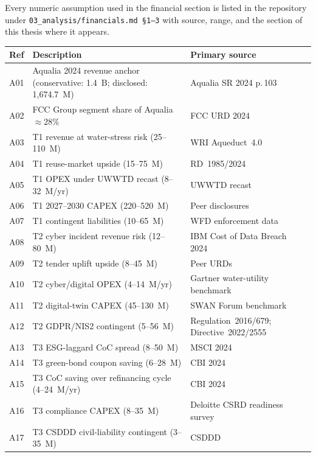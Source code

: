 \documentclass[11pt, a4paper, twoside, openright]{scrreprt}
\newcommand{\euro}{\texteuro}
\begin{document}
Every numeric assumption used in the financial section is listed in the repository under \texttt{03\_analysis/financials.md~\S 1--3} with source, range, and the section of this thesis where it appears.

\begin{center}
\small
\begin{longtable}{@{}lp{9.5cm}p{3cm}@{}}
\toprule
\textbf{Ref} & \textbf{Description} & \textbf{Primary source} \\
\midrule
\endhead
A01 & Aqualia 2024 revenue anchor (conservative: \euro{}1.4~B; disclosed: \euro{}1{,}674.7~M) & Aqualia SR 2024 p.\,103~\cite{aqualiaSR2024} \\
A02 & FCC Group segment share of Aqualia $\approx 28\%$ & FCC URD 2024 \\
A03 & T1 revenue at water-stress risk (\euro{}25--110~M) & WRI Aqueduct~4.0~\cite{aqueduct2023} \\
A04 & T1 reuse-market upside (\euro{}15--75~M) & RD~1985/2024~\cite{rd1985} \\
A05 & T1 OPEX under UWWTD recast (\euro{}8--32~M/yr) & UWWTD recast~\cite{uwwtd2024} \\
A06 & T1 2027--2030 CAPEX (\euro{}220--520~M) & Peer disclosures \\
A07 & T1 contingent liabilities (\euro{}10--65~M) & WFD enforcement data \\
A08 & T2 cyber incident revenue risk (\euro{}12--80~M) & IBM Cost of Data Breach 2024~\cite{ibm2024} \\
A09 & T2 tender uplift upside (\euro{}8--45~M) & Peer URDs \\
A10 & T2 cyber/digital OPEX (\euro{}4--14~M/yr) & Gartner water-utility benchmark \\
A11 & T2 digital-twin CAPEX (\euro{}45--130~M) & SWAN Forum benchmark \\
A12 & T2 GDPR/NIS2 contingent (\euro{}5--56~M) & Regulation~2016/679; Directive~2022/2555 \\
A13 & T3 ESG-laggard CoC spread (\euro{}8--50~M) & MSCI 2024~\cite{msci2024} \\
A14 & T3 green-bond coupon saving (\euro{}6--28~M) & CBI 2024~\cite{cbi2024} \\
A15 & T3 CoC saving over refinancing cycle (\euro{}4--24~M/yr) & CBI 2024~\cite{cbi2024} \\
A16 & T3 compliance CAPEX (\euro{}8--35~M) & Deloitte CSRD readiness survey \\
A17 & T3 CSDDD civil-liability contingent (\euro{}3--35~M) & CSDDD~\cite{csddd2024} \\
\bottomrule
\end{longtable}
\end{center}
\end{document}
